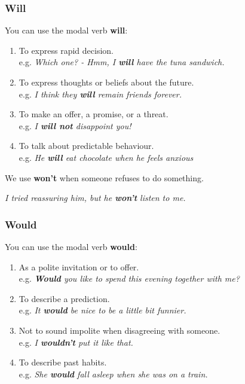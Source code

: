\documentclass[hidelinks,10pt,a4paper]{article}
\begin{document}
\subsubsection{Will}
You can use the modal verb \textbf{will}:
\begin{enumerate}[label=(\alph*)]
	\item To express rapid decision. \\
		e.g. \textit{Which one? - Hmm, I \textbf{will} have the tuna sandwich.}
	\item To express thoughts or beliefs about the future. \\
		e.g. \textit{I think they \textbf{will} remain friends forever.}
	\item To make an offer, a promise, or a threat. \\
		e.g. \textit{I \textbf{will not} disappoint you!}
	\item To talk about predictable behaviour. \\
		e.g. \textit{He \textbf{will} eat chocolate when he feels anxious}
\end{enumerate}

We use \textbf{won't} when someone refuses to do something.

\begin{center}
	\textit{I tried reassuring him, but he \textbf{won't} listen to me.}
\end{center}

\subsubsection{Would}
You can use the modal verb \textbf{would}:
\begin{enumerate}[label=(\alph*)]
	\item As a polite invitation or to offer. \\
		e.g. \textit{\textbf{Would} you like to spend this evening together with me?}
	\item To describe a prediction. \\
		e.g. \textit{It \textbf{would} be nice to be a little bit funnier.}
	\item Not to sound impolite when disagreeing with someone. \\
		e.g. \textit{I \textbf{wouldn't} put it like that.}
	\item To describe past habits. \\
		e.g. \textit{She \textbf{would} fall asleep when she was on a train.}
\end{enumerate}
\end{document}
